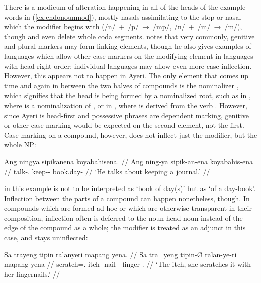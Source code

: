 There is a modicum of alteration happening in all of the heads of the example 
words in (\ref{ex:endonounmod}), mostly nasals assimilating to the stop or 
nasal which the modifier begins with (/n/~+~/p/~→~/mp/, /n/~+~/m/~→~/m/), 
though  and  even delete 
whole coda segments.
\citet[703]{bauer2001} notes that very commonly, genitive and plural markers 
may form linking elements, though he also gives examples of languages which 
allow other case markers on the modifying element in languages with head-right 
order; individual languages may allow even more case inflection. However, this 
appears not to happen in Ayeri. The only element that comes up time and again 
in between the two halves of compounds is the nominalizer , 
which signifies that the head is being formed by a nominalized root, such as in 
, where  is a 
nominalization of , or in 
, where  is derived 
from the verb . However, since Ayeri is head-first and 
possessive phrases are dependent marking, genitive or other case marking would 
be expected on the second element, not the first. Case marking on a compound, 
however, does not inflect just the modifier, but the whole NP:

\ex\begingl
	\gla Ang ningya sipikanena koyabahisena. //
	\glb Ang ning-ya sipik-an-ena koyabahis-ena //
	\glc \AgtT{} talk-\TsgM{}.\Top{} keep-\Nmlz{}-\Gen{} book.day-\Gen{} //
	\glft `He talks about keeping a journal.' //
\endgl\xe

 in this example is not to be interpreted as 
`book of day(s)' but as `of a day-book'. Inflection between the parts of a 
compound can happen nonetheless, though. In compounds which are formed ad 
hoc or which are otherwise transparent in their composition, inflection often 
is deferred to the noun head noun instead of the edge of the compound as a 
whole; the modifier is treated as an adjunct in this case, and stays 
uninflected:

\ex\label{ex:nouncompdiv}\begingl
	\gla Sa trayeng tipin ralanyeri mapang yena. //
	\glb Sa tra=yeng tipin-Ø ralan-ye-ri mapang yena //
	\glc \PatT{} scratch=\TsgF{}.\Aarg{} itch-\Top{} nail-\Pl{}-\Ins{} 
		finger \TsgF{}.\Gen{} //
	\glft `The itch, she scratches it with her fingernails.' //
\endgl\xe

